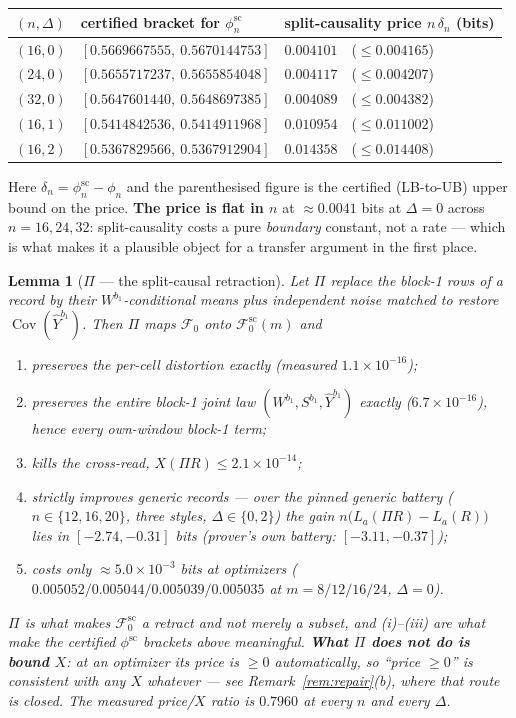 \documentclass[11pt]{article}
\newtheorem{lemma}{Lemma}
\theoremstyle{definition}
\theoremstyle{remark}
\begin{document}
\begin{center}
\begin{tabular}{lll}
$(n,\Delta)$ & certified bracket for $\phi^{\mathrm{sc}}_n$
  & split-causality price $n\,\delta_n$ (bits)\\
\hline
$(16,0)$ & $[0.5669667555,\ 0.5670144753]$ & $0.004101$\ \ ($\le0.004165$)\\
$(24,0)$ & $[0.5655717237,\ 0.5655854048]$ & $0.004117$\ \ ($\le0.004207$)\\
$(32,0)$ & $[0.5647601440,\ 0.5648697385]$ & $0.004089$\ \ ($\le0.004382$)\\
$(16,1)$ & $[0.5414842536,\ 0.5414911968]$ & $0.010954$\ \ ($\le0.011002$)\\
$(16,2)$ & $[0.5367829566,\ 0.5367912904]$ & $0.014358$\ \ ($\le0.014408$)\\
\end{tabular}
\end{center}

\noindent Here $\delta_n=\phi^{\mathrm{sc}}_n-\phi_n$ and the
parenthesised figure is the certified (LB-to-UB) upper bound on the
price. \textbf{The price is flat in $n$} at $\approx0.0041$ bits at
$\Delta=0$ across $n=16,24,32$: split-causality costs a pure
\emph{boundary} constant, not a rate --- which is what makes it a
plausible object for a transfer argument in the first place.

\begin{lemma}[$\Pi$ --- the split-causal retraction]
\label{lem:pi}
Let $\Pi$ replace the block-1 rows of a record by their
$W^{b_1}$-conditional means plus independent noise matched to restore
$\operatorname{Cov}(\hat Y^{b_1})$. Then $\Pi$ maps $\mathcal F_0$ onto
$\mathcal F_0^{\mathrm{sc}}(m)$ and
\begin{enumerate}
\item[(i)] preserves the per-cell \emph{distortion} exactly
(measured $1.1\times10^{-16}$);
\item[(ii)] preserves the entire block-1 joint law
$(W^{b_1},S^{b_1},\hat Y^{b_1})$ exactly ($6.7\times10^{-16}$), hence
every own-window block-1 term;
\item[(iii)] kills the cross-read, $X(\Pi R)\le2.1\times10^{-14}$;
\item[(iv)] \emph{strictly improves} generic records --- over the
pinned generic battery ($n\in\{12,16,20\}$, three styles,
$\Delta\in\{0,2\}$) the gain $n\bigl(L_a(\Pi R)-L_a(R)\bigr)$ lies in
$[-2.74,-0.31]$ bits (prover's own battery: $[-3.11,-0.37]$);
\item[(v)] costs only $\approx5.0\times10^{-3}$ bits \emph{at
optimizers} ($0.005052/0.005044/0.005039/0.005035$ at
$m=8/12/16/24$, $\Delta=0$).
\end{enumerate}
$\Pi$ is what makes $\mathcal F_0^{\mathrm{sc}}$ a \emph{retract} and
not merely a subset, and (i)--(iii) are what make the certified
$\phi^{\mathrm{sc}}$ brackets above meaningful. \textbf{What $\Pi$
does \emph{not} do is bound $X$}: at an optimizer its price is
$\ge0$ automatically, so ``price $\ge0$'' is consistent with any $X$
whatever --- see Remark~\ref{rem:repair}(b), where that route is
closed. The measured price/$X$ ratio is $0.7960$ at every $n$ and
every $\Delta$.
\end{lemma}
\end{document}
